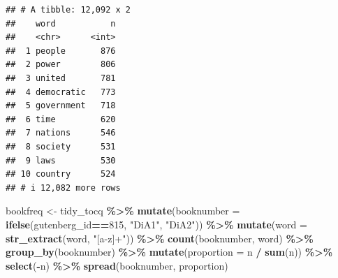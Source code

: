 \documentclass[
]{article}
\newenvironment{Shaded}{\begin{snugshade}}{\end{snugshade}}
\newcommand{\AttributeTok}[1]{\textcolor[rgb]{0.13,0.29,0.53}{#1}}
\newcommand{\DecValTok}[1]{\textcolor[rgb]{0.00,0.00,0.81}{#1}}
\newcommand{\FunctionTok}[1]{\textcolor[rgb]{0.13,0.29,0.53}{\textbf{#1}}}
\newcommand{\NormalTok}[1]{#1}
\newcommand{\OtherTok}[1]{\textcolor[rgb]{0.56,0.35,0.01}{#1}}
\newcommand{\SpecialCharTok}[1]{\textcolor[rgb]{0.81,0.36,0.00}{\textbf{#1}}}
\newcommand{\StringTok}[1]{\textcolor[rgb]{0.31,0.60,0.02}{#1}}
\begin{document}
\begin{verbatim}
## # A tibble: 12,092 x 2
##    word           n
##    <chr>      <int>
##  1 people       876
##  2 power        806
##  3 united       781
##  4 democratic   773
##  5 government   718
##  6 time         620
##  7 nations      546
##  8 society      531
##  9 laws         530
## 10 country      524
## # i 12,082 more rows
\end{verbatim}

\begin{Shaded}
\begin{Highlighting}[]
\NormalTok{bookfreq }\OtherTok{\textless{}{-}}\NormalTok{ tidy\_tocq }\SpecialCharTok{\%\textgreater{}\%}
  \FunctionTok{mutate}\NormalTok{(}\AttributeTok{booknumber =} \FunctionTok{ifelse}\NormalTok{(gutenberg\_id}\SpecialCharTok{==}\DecValTok{815}\NormalTok{, }\StringTok{"DiA1"}\NormalTok{, }\StringTok{"DiA2"}\NormalTok{)) }\SpecialCharTok{\%\textgreater{}\%}
  \FunctionTok{mutate}\NormalTok{(}\AttributeTok{word =} \FunctionTok{str\_extract}\NormalTok{(word, }\StringTok{"[a{-}z\textquotesingle{}]+"}\NormalTok{)) }\SpecialCharTok{\%\textgreater{}\%}
  \FunctionTok{count}\NormalTok{(booknumber, word) }\SpecialCharTok{\%\textgreater{}\%}
  \FunctionTok{group\_by}\NormalTok{(booknumber) }\SpecialCharTok{\%\textgreater{}\%}
  \FunctionTok{mutate}\NormalTok{(}\AttributeTok{proportion =}\NormalTok{ n }\SpecialCharTok{/} \FunctionTok{sum}\NormalTok{(n)) }\SpecialCharTok{\%\textgreater{}\%} 
  \FunctionTok{select}\NormalTok{(}\SpecialCharTok{{-}}\NormalTok{n) }\SpecialCharTok{\%\textgreater{}\%} 
  \FunctionTok{spread}\NormalTok{(booknumber, proportion)}


\end{Highlighting}
\end{Shaded}
\end{document}
